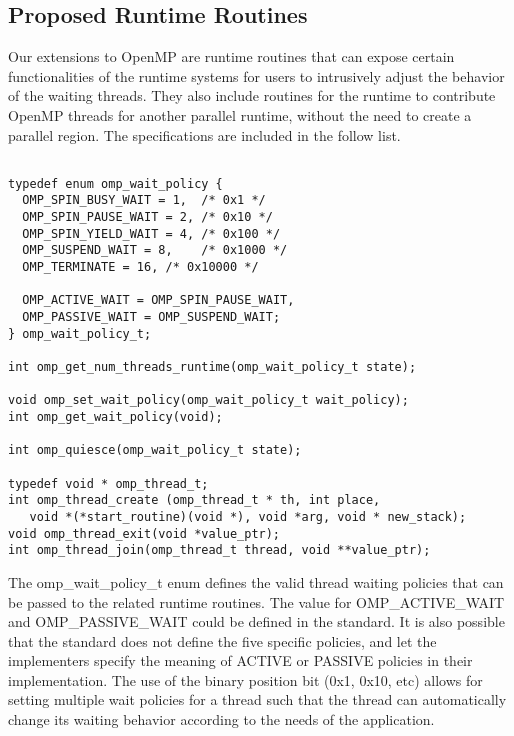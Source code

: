 \subsection{Proposed Runtime Routines} 
Our extensions to OpenMP are runtime routines that can expose 
certain functionalities of the runtime systems for users to 
intrusively adjust the behavior of the waiting threads.  
They also include routines for the runtime to contribute OpenMP threads for another parallel runtime, without
the need to create a {\sf parallel} region. The specifications are included in the follow list. 

\lstset{basicstyle=\sffamily\small,language=c, numbersep=1pt}
\begin{lstlisting}[frame=single]  % Start your code-block

typedef enum omp_wait_policy {
  OMP_SPIN_BUSY_WAIT = 1,  /* 0x1 */
  OMP_SPIN_PAUSE_WAIT = 2, /* 0x10 */
  OMP_SPIN_YIELD_WAIT = 4, /* 0x100 */
  OMP_SUSPEND_WAIT = 8,    /* 0x1000 */
  OMP_TERMINATE = 16, /* 0x10000 */

  OMP_ACTIVE_WAIT = OMP_SPIN_PAUSE_WAIT,
  OMP_PASSIVE_WAIT = OMP_SUSPEND_WAIT;
} omp_wait_policy_t; 

int omp_get_num_threads_runtime(omp_wait_policy_t state);

void omp_set_wait_policy(omp_wait_policy_t wait_policy);
int omp_get_wait_policy(void);

int omp_quiesce(omp_wait_policy_t state);

typedef void * omp_thread_t;
int omp_thread_create (omp_thread_t * th, int place,  
   void *(*start_routine)(void *), void *arg, void * new_stack);
void omp_thread_exit(void *value_ptr);
int omp_thread_join(omp_thread_t thread, void **value_ptr);

\end{lstlisting}
The {\sf omp\_wait\_policy\_t} enum defines the valid thread waiting policies that can be passed to the 
related runtime routines. The value for {\sf OMP\_ACTIVE\_WAIT} and {\sf OMP\_PASSIVE\_WAIT} could be defined
in the standard. It is also possible that the standard does not define the five specific policies, and let 
the implementers specify the meaning of ACTIVE or PASSIVE policies in their implementation. The use of the binary
position bit (0x1, 0x10, etc) allows for setting multiple wait policies for a thread such that the thread can automatically change
its waiting behavior according to the needs of the application. 



